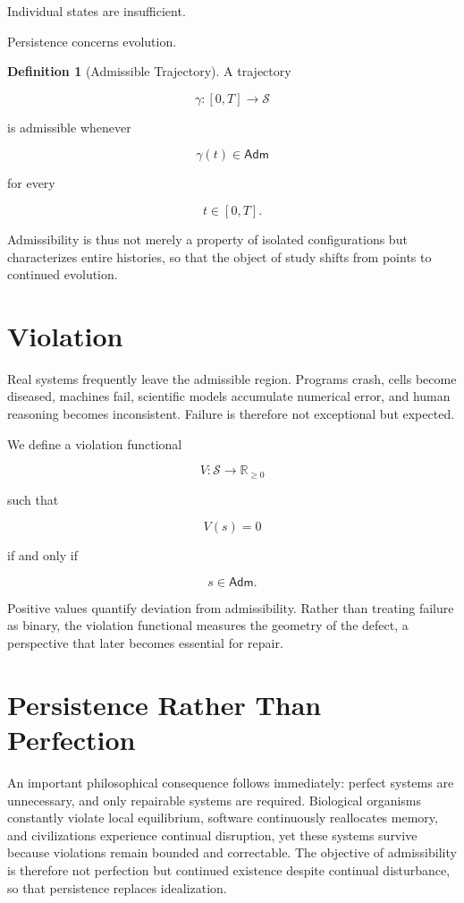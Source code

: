 \documentclass[11pt,oneside]{book}
\numberwithin{equation}{chapter}
\theoremstyle{definition}
\newtheorem{definition}{Definition}[chapter]
\theoremstyle{plain}
\newcommand{\State}{\mathcal{S}}
\newcommand{\Adm}{\mathsf{Adm}}
\begin{document}
Individual states are insufficient.

Persistence concerns evolution.

\begin{definition}[Admissible Trajectory]

A trajectory

\[
\gamma :
[0,T]
\rightarrow
\State
\]

is admissible whenever

\[
\gamma(t)
\in
\Adm
\]

for every

\[
t
\in
[0,T].
\]

\end{definition}

Admissibility is thus not merely a property of isolated configurations but characterizes entire histories, so that the object of study shifts from points to continued evolution.

\section{Violation}

Real systems frequently leave the admissible region. Programs crash, cells become diseased, machines fail, scientific models accumulate numerical error, and human reasoning becomes inconsistent. Failure is therefore not exceptional but expected.

We define a violation functional

\[
V :
\State
\rightarrow
\mathbb{R}_{\ge 0}
\]

such that

\[
V(s)=0
\]

if and only if

\[
s
\in
\Adm.
\]

Positive values quantify deviation from admissibility. Rather than treating failure as binary, the violation functional measures the geometry of the defect, a perspective that later becomes essential for repair.

\section{Persistence Rather Than Perfection}

An important philosophical consequence follows immediately: perfect systems are unnecessary, and only repairable systems are required. Biological organisms constantly violate local equilibrium, software continuously reallocates memory, and civilizations experience continual disruption, yet these systems survive because violations remain bounded and correctable. The objective of admissibility is therefore not perfection but continued existence despite continual disturbance, so that persistence replaces idealization.
\end{document}
